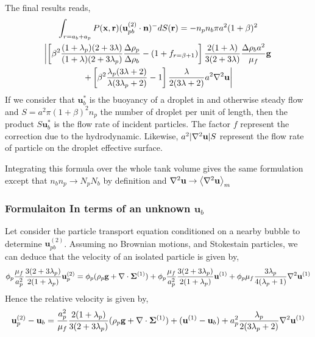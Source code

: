 \documentclass[12pt]{My_preprint}
\begin{document}
The final results reads, 
\begin{multline*} 
    \int_{r=a_b+a_p } 
    P(\textbf{x},\textbf{r}) (\textbf{u}_{pb}^{(2)}\cdot \textbf{n})^- dS(\textbf{r})
    =
    - n_pn_b \pi a^2(1+\beta)^2 \\\left|
        \left[\beta^2\frac{(1+\lambda_p)(2+3\lambda)}{(1+\lambda)(2+3\lambda_p)}\frac{\Delta\rho_p}{\Delta\rho_b}  - (1 + f_{r=\beta+1})  \right]  \frac{2(1+\lambda)}{3(2+3\lambda)} \frac{\Delta\rho_b a^2}{\mu_f}\textbf{g} \right.\\\left.
        + \left[\beta^2\frac{\lambda_p(3\lambda+2)}{\lambda(3\lambda_p +2)} - 1 \right] \frac{\lambda}{2(3\lambda +2)}a^2 \mathbf{\nabla}^2 \textbf{u}
    \right|
\end{multline*} 
If we consider that $\textbf{u}_b^*$ is the buoyancy of a droplet in and otherwise steady flow and $S = a^2 \pi (1+\beta)^2 n_p $ the number of droplet per unit of  length, then the product $S \textbf{u}_b^*$ is the flow rate of incident particles. 
The factor $f$ represent the correction due to the hydrodynamic. 
Likewise, $a^2 |\mathbf{\nabla}^2 \textbf{u}| S$ represent the flow rate of particle on the droplet effective surface. 



Integrating this formula over the whole tank volume gives the same formulation except that $n_bn_p \to N_p N_b$ by definition and $\mathbf{\nabla}^2 \textbf{u} \to \left<\mathbf{\nabla}^2 \textbf{u}\right>_m$ 



\subsubsection{Formulaiton In terms of an unknown $\textbf{u}_b$}
Let consider the particle transport equation conditioned on a nearby bubble to determine $\textbf{u}_{pb}^{(2)}$. 
Assuming no Brownian motions, and Stokestain  particles, we can deduce that the velocity of an isolated particle is given by, 
\begin{equation}
    \phi_p
    \frac{\mu_f}{a_p^2}
    \frac{3(2+3\lambda_p)}{2(1+\lambda_p)}\textbf{u}_p^{(2)}
    =
    \phi_p( \rho_p\textbf{g}+ \mathbf{\nabla}\cdot\bm\Sigma^{(1)} )
    +
    \phi_p\frac{\mu_f}{a_p^2}
    \frac{3(2+3\lambda_p)}{2(1+\lambda_p)}\textbf{u}^{(1)} 
    + \phi_p\mu_f  \frac{3\lambda_p}{4(\lambda_p +1)} \mathbf{\nabla}^2 \textbf{u}^{(1)}
\end{equation}
Hence the relative velocity is given by, 
\begin{equation}
    \textbf{u}_p^{(2)} - \textbf{u}_b
    =
    \frac{a_p^2}{\mu_f}
    \frac{2(1+\lambda_p)}{3(2+3\lambda_p)}( \rho_p\textbf{g}+ \mathbf{\nabla}\cdot\bm\Sigma^{(1)} )
    + (\textbf{u}^{(1)} - \textbf{u}_b)
    + a_p^2 \frac{\lambda_p}{2(3\lambda_p +2)} \mathbf{\nabla}^2 \textbf{u}^{(1)}
\end{equation}
\end{document}
